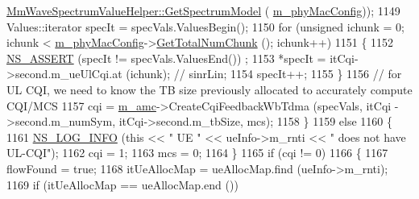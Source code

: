\begin{DoxyCode}
      \hyperlink{classns3_1_1MmWaveSpectrumValueHelper_a23fc6693b28bb565a97768b536225b58}{MmWaveSpectrumValueHelper::GetSpectrumModel} (
      \hyperlink{classns3_1_1MmWaveMacScheduler_a24d7af4971d2e500fe543cefbafa2fd9}{m\_phyMacConfig}));
1149                                                 Values::iterator specIt = specVals.ValuesBegin();
1150                                                 \textcolor{keywordflow}{for} (\textcolor{keywordtype}{unsigned} ichunk = 0; ichunk < 
      \hyperlink{classns3_1_1MmWaveMacScheduler_a24d7af4971d2e500fe543cefbafa2fd9}{m\_phyMacConfig}->\hyperlink{classns3_1_1MmWavePhyMacCommon_a97e82c809a351fea9d5058ac1bb4c3c6}{GetTotalNumChunk} (); ichunk++)
1151                                                 \{
1152                                                         \hyperlink{assert_8h_a6dccdb0de9b252f60088ce281c49d052}{NS\_ASSERT} (specIt != specVals.ValuesEnd())
      ;
1153                                                         *specIt = itCqi->second.m\_ueUlCqi.at (ichunk); \textcolor{comment}{//
      sinrLin;}
1154                                                         specIt++;
1155                                                 \}
1156                                                 \textcolor{comment}{// for UL CQI, we need to know the TB size previously
       allocated to accurately compute CQI/MCS}
1157                                                 cqi = \hyperlink{classns3_1_1MmWaveFlexTtiMaxWeightMacScheduler_a36c22ad89fe5d6743a058f253a43a70d}{m\_amc}->CreateCqiFeedbackWbTdma (specVals, itCqi
      ->second.m\_numSym, itCqi->second.m\_tbSize, mcs);
1158                                         \}
1159                                         \textcolor{keywordflow}{else}
1160                                         \{
1161                                                 \hyperlink{group__logging_gafbd73ee2cf9f26b319f49086d8e860fb}{NS\_LOG\_INFO} (\textcolor{keyword}{this} << \textcolor{stringliteral}{" UE "} << ueInfo->m\_rnti <<
       \textcolor{stringliteral}{" does not have UL-CQI"});
1162                                                 cqi = 1;
1163                                                 mcs = 0;
1164                                         \}
1165                                         \textcolor{keywordflow}{if} (cqi != 0)
1166                                         \{
1167                                                 flowFound = \textcolor{keyword}{true};
1168                                                 itUeAllocMap = ueAllocMap.find (ueInfo->m\_rnti);
1169                                                 \textcolor{keywordflow}{if} (itUeAllocMap == ueAllocMap.end ())

\end{DoxyCode}
